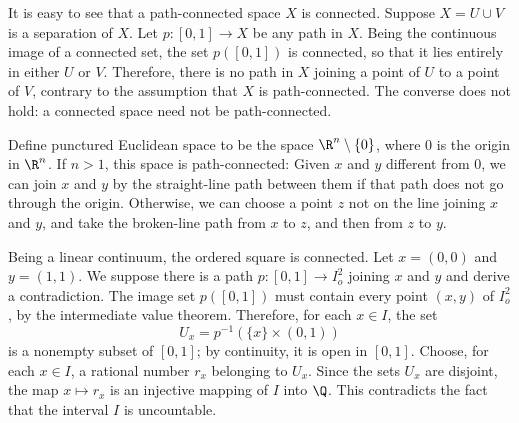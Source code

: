 It is easy to see that a path-connected space $X$ is connected. Suppose $X=U\cup V$ is a separation of $X$. Let $p:[0,1]\to X$ be any path in $X$. Being the continuous image of a connected set, the set $p([0,1])$ is connected, so that it lies entirely in either $U$ or $V$. Therefore, there is no path in $X$ joining a point of $U$ to a point of $V$, contrary to the assumption that $X$ is path-connected. The converse does not hold: a connected space need not be path-connected.
\begin{example}
Define punctured Euclidean space to be the space $\R^n\setminus\{0\}$, where $0$ is the origin in $\R^n$. If $n>1$, this space is path-connected: Given $x$ and $y$ different from $0$, we can join $x$ and $y$ by the straight-line path between them if that path does not go through the origin. Otherwise, we can choose a point $z$ not on the line joining $x$ and $y$, and take the broken-line path from $x$ to $z$, and then from $z$ to $y$.
\end{example}
\begin{example}
Being a linear continuum, the ordered square is connected. Let $x=(0,0)$ and $y=(1,1)$. We suppose there is a path $p:[0,1]\to I^2_o$ joining $x$ and $y$ and derive a contradiction. The image set $p([0,1])$ must contain every point $(x,y)$ of $I^2_o$, by the intermediate value theorem. Therefore, for each $x\in I$, the set
\[U_x=p^{-1}(\{x\}\times(0,1))\]
is a nonempty subset of $[0,1]$; by continuity, it is open in $[0,1]$. Choose, for each $x\in I$, a rational number $r_x$ belonging to $U_x$. Since the sets $U_x$ are disjoint, the map $x\mapsto r_x$ is an injective mapping of $I$ into $\Q$. This contradicts the fact that the interval $I$ is uncountable.
\end{example}
